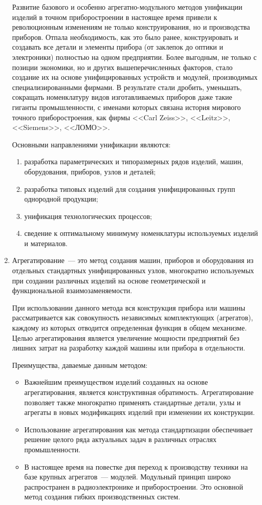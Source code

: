 \begin{enumerate}
Развитие базового и особенно агрегатно-модульного методов унификации изделий в точном приборостроении в настоящее время привели к революционным изменениям не только конструирования, но и производства приборов. Отпала необходимость, как это было ранее, конструировать и создавать все детали и элементы прибора (от заклепок до оптики и электроники) полностью на одном предприятии. Более выгодным, не только с позиции экономики, но и других вышеперечисленных факторов, стало создание их на основе унифицированных устройств и модулей, производимых специализированными фирмами. В результате стали дробить, уменьшать, сокращать номенклатуру видов изготавливаемых приборов даже такие гиганты промышленности, с именами которых связана история мирового точного приборостроения, как фирмы <<Carl Zeiss>>, <<Leitz>>, <<Siemens>>, <<ЛОМО>>.

Основными направлениями унификации являются:
\begin{enumerate}
\item разработка параметрических и типоразмерных рядов изделий, машин, оборудования, приборов, узлов и деталей;
\item разработка типовых изделий для создания унифицированных групп однородной продукции;
\item унификация технологических процессов;
\item сведение к оптимальному минимуму номенклатуры используемых изделий и материалов. 
\end{enumerate}

\item Агрегатирование~--- это метод создания машин, приборов и оборудования из отдельных стандартных унифицированных узлов, многократно используемых при создании различных изделий на основе геометрической и функциональной взаимозаменяемости.

При использовании данного метода вся конструкция прибора или машины рассматривается как совокупность независимых комплектующих (агрегатов), каждому из которых отводится определенная функция в общем механизме. Целью агрегатирования является увеличение мощности предприятий без лишних затрат на разработку каждой машины или прибора в отдельности.

Преимущества, даваемые данным методом: 
\begin{itemize}
\item Важнейшим преимуществом изделий созданных на основе агрегатирования, является конструктивная обратимость. Агрегатирование позволяет также многократно применять стандартные детали, узлы и агрегаты в новых модификациях изделий при изменении их конструкции.
\item Использование агрегатирования как метода стандартизации обеспечивает решение целого ряда актуальных задач в различных отраслях промышленности.
\item В настоящее время на повестке дня переход к производству техники на базе крупных агрегатов~--- модулей. Модульный принцип широко распространен в радиоэлектронике и приборостроении. Это основной метод создания гибких производственных систем.
\end{itemize}


\end{enumerate}
